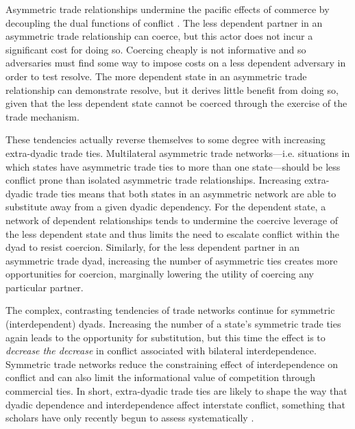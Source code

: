 \documentclass[12pt]{article}
\theoremstyle{hypothesis}
\begin{document}
Asymmetric trade relationships undermine the pacific effects of commerce by decoupling the dual functions of conflict \citep{Hirschman:1945,Keohane:1977}. The less dependent partner in an asymmetric trade relationship can coerce, but this actor does not incur a significant cost for doing so. Coercing cheaply is not informative and so adversaries must find some way to impose costs on a less dependent adversary in order to test resolve. The more dependent state in an asymmetric trade relationship can demonstrate resolve, but it derives little benefit from doing so, given that the less dependent state cannot be coerced through the exercise of the trade mechanism.

These tendencies actually reverse themselves to some degree with increasing extra-dyadic trade ties.  Multilateral asymmetric trade networks---i.e. situations in which states have asymmetric trade ties to more than one state---should be less conflict prone than isolated asymmetric trade relationships. Increasing extra-dyadic trade ties means that both states in an asymmetric network are able to substitute away from a given dyadic dependency.  For the dependent state, a network of dependent relationships tends to undermine the coercive leverage of the less dependent state and thus limits the need to escalate conflict within the dyad to resist coercion. Similarly, for the less dependent partner in an asymmetric trade dyad, increasing the number of asymmetric ties creates more opportunities for coercion, marginally lowering the utility of coercing any particular partner.

The complex, contrasting tendencies of trade networks continue for symmetric (interdependent) dyads. Increasing the number of a state's symmetric trade ties again leads to the opportunity for substitution, but this time the effect is to \textit{decrease the decrease} in conflict associated with bilateral interdependence.  Symmetric trade networks reduce the constraining effect of interdependence on conflict and can also limit the informational value of competition through commercial ties. In short, extra-dyadic trade ties are likely to shape the way that dyadic dependence and interdependence affect interstate conflict, something that scholars have only recently begun to assess systematically \citep{Crescenzi:2005,Martin:2008,Dorussen:2010,Kinne:2012,Kinne:2014b}.
\end{document}
